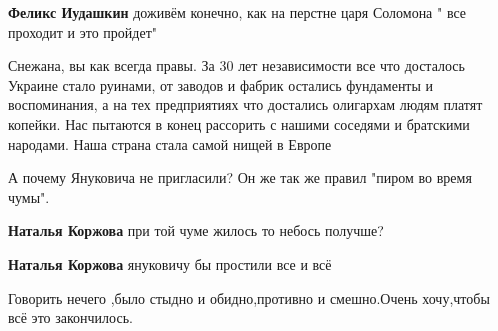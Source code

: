 \begin{itemize}
\begin{itemize}
\textbf{Феликс Иудашкин} доживём конечно, как на перстне царя Соломона " все проходит и это пройдет"
\end{itemize}

 

Снежана, вы как всегда правы. За 30 лет независимости все что досталось Украине
стало руинами, от заводов и фабрик остались фундаменты и воспоминания, а на тех
предприятиях что достались олигархам людям платят копейки. Нас пытаются в конец
рассорить с нашими соседями и братскими народами. Наша страна стала самой нищей
в Европе

 
А почему Януковича не пригласили? Он же так же правил "пиром во время чумы".

\begin{itemize}
 
\textbf{Наталья Коржова} при той чуме жилось то небось получше?

 
\textbf{Наталья Коржова} януковичу бы простили все и всё
\end{itemize}

 
Говорить нечего ,было стыдно и обидно,противно и смешно.Очень хочу,чтобы всё это закончилось.


\end{itemize}
